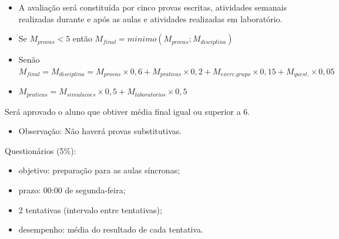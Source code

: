 \begin{frame}[allowframebreaks]{\insertsubsection}
\begin{itemize}
		\item A avaliação será constituída por cinco provas escritas, atividades semanais realizadas durante e após as aulas e atividades realizadas em laboratório.
			\item Se $M_{provas} < 5$ então $M_{final} = minimo(M_{provas}; M_{disciplina})$
            \item Senão $M_{final} = M_{disciplina} = M_{provas}\times 0,6 + M_{praticas}\times 0,2 + M_{exerc.grupo} \times 0,15+ M_{quest.} \times 0,05 $
                \item $M_{praticas} = M_{simulacoes} \times 0,5 + M_{laboratorios} \times 0,5$
		\end{itemize}
		\item Será aprovado o aluno que obtiver média final igual ou superior a 6. 
		\begin{itemize}
			\item Observação: Não haverá provas substitutivas. 
		\end{itemize}
	\framebreak
		\item Questionários (5\%):
		\begin{itemize}
		    \item objetivo: preparação para as aulas síncronas;
		     \item prazo: 00:00 de segunda-feira;
		    \item 2 tentativas (intervalo entre tentativas);
		    \item desempenho: média do resultado de cada tentativa.
		\end{itemize}
		

\end{frame}
